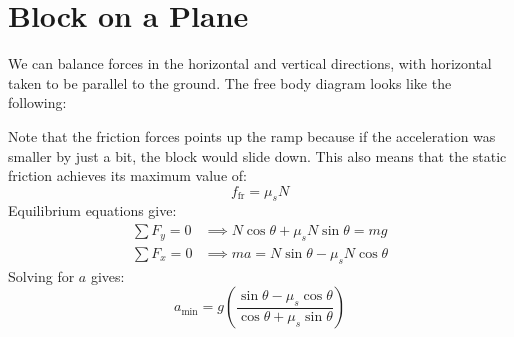 \documentclass{article}
\begin{document}
\newpage
\section{Block on a Plane}
We can balance forces in the horizontal and vertical directions, with horizontal taken to be parallel to the ground. The free body diagram looks like the following:
\begin{center}
\end{center}
Note that the friction forces points up the ramp because if the acceleration was smaller by just a bit, the block would slide down. This also means that the static friction achieves its maximum value of:
\begin{equation}
    f_\text{fr} = \mu_sN
    \label{eq:}
\end{equation}
Equilibrium equations give:
\begin{align}
    \sum F_y = 0 &\implies N\cos\theta + \mu_sN\sin\theta = mg \\ 
    \sum F_x = 0 &\implies ma = N\sin\theta - \mu_sN\cos\theta
\end{align}
Solving for $a$ gives:
\begin{equation}
    \boxed{a_\text{min} = g\left(\frac{\sin\theta-\mu_s\cos\theta}{\cos\theta+\mu_s\sin\theta}\right)}
    \label{eq:}
\end{equation}
\end{document}
